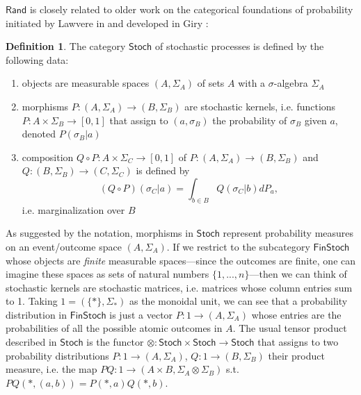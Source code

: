 \documentclass{article}
\theoremstyle{definition}
\newtheorem{definition}[theorem]{Definition}
\newcommand{\Cat}[1]{\mathsf{#1}}
\def\Rand{\Cat{Rand}}
\def\Stoch{\Cat{Stoch}}
\def\FinStoch{\Cat{FinStoch}}
\begin{document}
$\Rand$ is closely related to older work on the categorical foundations of probability initiated by Lawvere in \cite{lawvere62} and developed in Giry \cite{giry82}:
\begin{definition}
The category $\Stoch$ of stochastic processes is defined by the following data:
\begin{enumerate}
\item objects are measurable spaces $(A, \Sigma_A)$ of sets $A$ with a $\sigma$-algebra $\Sigma_A$
\item morphisms $P : (A, \Sigma_A) \to (B, \Sigma_B)$ are stochastic kernels, i.e. functions $P : A \times \Sigma_B \to [0,1]$ that assign to $(a, \sigma_B)$ the probability of $\sigma_B$ given $a$, denoted $P( \sigma_B | a)$ %
\item composition $Q \circ P : A \times \Sigma_C \to [0,1]$ of $P : (A,\Sigma_A) \to (B,\Sigma_B)$ and $Q: (B,\Sigma_B) \to (C, \Sigma_C)$ is defined by \[(Q \circ P)(\sigma_C | a) = \int_{b \in B} Q(\sigma_C | b) dP_a,\] i.e. marginalization over $B$
\end{enumerate}
\end{definition}

As suggested by the notation, morphisms in $\Stoch$ represent probability measures on an event/outcome space $(A, \Sigma_A)$. If we restrict to the subcategory $\FinStoch$ whose objects are \emph{finite} measurable spaces---since the outcomes are finite, one can imagine these spaces as sets of natural numbers $\{1, ..., n\}$---then we can think of stochastic kernels are stochastic matrices, i.e. matrices whose column entries sum to 1. Taking $1 = (\{\ast\}, \Sigma_\ast)$ as the monoidal unit, we can see that a probability distribution in $\FinStoch$ is just a vector $P : 1 \to (A, \Sigma_A)$ whose entries are the probabilities of all the possible atomic outcomes in $A$. The usual tensor product described in $\Stoch$ is the functor $\otimes: \Stoch \times \Stoch \to \Stoch$ that assigns to two probability distributions $P : 1 \to (A, \Sigma_A)$, $Q : 1 \to (B, \Sigma_B)$ their product measure, i.e. the map $PQ : 1 \to (A \times B, \Sigma_A \otimes \Sigma_B)$ s.t. $PQ(\ast, (a,b)) = P(\ast,a) Q(\ast, b)$.
\end{document}
